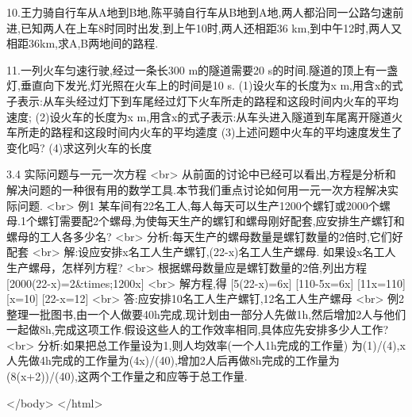 10.王力骑自行车从A地到B地,陈平骑自行车从B地到A地,两人都沿同一公路匀速前进,已知两人在上车8时同时出发,到上午10时,两人还相距36 km,到中午12时,两人又相距36km,求A,B两地间的路程.

11.一列火车匀速行驶,经过一条长300 m的隧道需要20 s的时间.隧道的顶上有一盏灯,垂直向下发光,灯光照在火车上的时间是10 s.
(1)设火车的长度为x m,用含x的式子表示:从车头经过灯下到车尾经过灯下火车所走的路程和这段时间内火车的平均速度;
(2)设火车的长度为x m,用含x的式子表示:从车头进入隧道到车尾离开隧道火车所走的路程和这段时间内火车的平均逵度
(3)上述问题中火车的平均速度发生了变化吗?
(4)求这列火车的长度
\endexercise


3.4  实际问题与一元一次方程
<br>
从前面的讨论中已经可以看出,方程是分析和解决问题的一种很有用的数学工具.本节我们重点讨论如何用一元一次方程解决实际问题.
\beginexample
<br>
例1  某车间有22名工人,每人每天可以生产1200个螺钉或2000个螺母.1个螺钉需要配2个螺母,为使每天生产的螺钉和螺母刚好配套,应安排生产螺钉和螺母的工人各多少名?
<br>
分析:每天生产的螺母数量是螺钉数量的2倍时,它们好配套
<br>
解:设应安排x名工人生产螺钉,(22-x)名工人生产螺母.
如果设x名工人生产螺母，怎样列方程?
<br>
根据螺母数量应是螺钉数量的2倍,列出方程
[2000(22-x)=2&times;1200x]
<br>
解方程,得
[5(22-x)=6x]
[110-5x=6x]
[11x=110]
[x=10]
[22-x=12]
<br>
答:应安排10名工人生产螺钉,12名工人生产螺母
<br>
例2整理一批图书,由一个人做要40h完成,现计划由一部分人先做1h,然后增加2人与他们一起做8h,完成这项工作.假设这些人的工作效率相同,具体应先安排多少人工作?
<br>
分析:如果把总工作量设为1,则人均效率(一个人1h完成的工作量)
为(1)/(4),x人先做4h完成的工作量为(4x)/(40),增加2人后再做8h完成的工作量为(8(x+2))/(40),这两个工作量之和应等于总工作量.
\endexample

\enddocument

</body>
</html>
